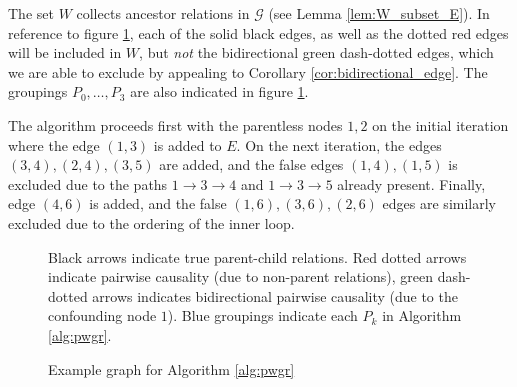 \documentclass[12pt]{article}
\def\gcg{\mathcal{G}}  %
\begin{document}
\begin{example}
  The set $W$ collects ancestor relations in $\gcg$ (see Lemma
  \ref{lem:W_subset_E}).  In reference to figure
  \ref{fig:example_fig3}, each of the solid black edges, as well as
  the dotted red edges will be included in $W$, but \textit{not} the
  bidirectional green dash-dotted edges, which we are able to exclude
  by appealing to Corollary \ref{cor:bidirectional_edge}.  The
  groupings $P_0, \ldots, P_3$ are also indicated in figure
  \ref{fig:example_fig3}.

  The algorithm proceeds first with the parentless nodes $1, 2$ on the
  initial iteration where the edge $(1, 3)$ is added to $E$.  On the
  next iteration, the edges $(3, 4), (2, 4), (3, 5)$ are added, and
  the false edges $(1, 4), (1, 5)$ is excluded due to the paths
  $1 \rightarrow 3 \rightarrow 4$ and $1 \rightarrow 3 \rightarrow 5$
  already present.  Finally, edge $(4, 6)$ is added, and the false
  $(1, 6), (3, 6), (2, 6)$ edges are similarly excluded due to the
  ordering of the inner loop.
  
  \begin{figure}
    \centering
    \caption{Example graph for Algorithm \ref{alg:pwgr}}
    \footnotesize{Black arrows indicate true parent-child
      relations.  Red dotted arrows indicate pairwise causality (due to
      non-parent relations), green dash-dotted arrows indicates
      bidirectional pairwise causality (due to the confounding node
      $1$).  Blue groupings indicate each $P_k$ in Algorithm
      \ref{alg:pwgr}.}
    \label{fig:example_fig3}
    

\end{figure}
\end{example}
\end{document}
